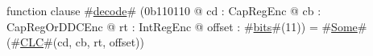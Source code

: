 function clause #\hyperref[sailMIPSzdecode]{decode}# (0b110110 @ cd : CapRegEnc @ cb : CapRegOrDDCEnc @ rt : IntRegEnc @ offset : #\hyperref[sailMIPSzbits]{bits}#(11)) = #\hyperref[sailMIPSzSome]{Some}#(#\hyperref[sailMIPSzCLC]{CLC}#(cd, cb, rt, offset))
